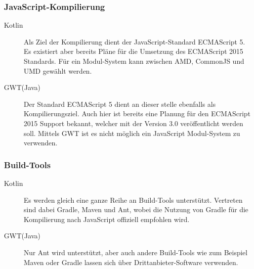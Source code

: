 \subsubsection{JavaScript-Kompilierung}
\begin{description}
	\item[Kotlin] Als Ziel der Kompilierung dient der JavaScript-Standard ECMAScript 5. Es existiert aber bereits Pläne für die Umsetzung des ECMAScript 2015 Standards. Für ein Modul-System kann zwischen \gls{AMD}, CommonJS und \gls{UMD} gewählt werden. \cite{kotlinJavaScript, kotlinJsModules} 
	\item[GWT(Java)] Der Standard ECMAScript 5 dient an dieser stelle ebenfalls als Kompilierungsziel. Auch hier ist bereits eine Planung für den ECMAScript 2015 Support bekannt, welcher mit der Version 3.0 veröffentlicht werden soll. Mittels \gls{GWT} ist es nicht möglich ein JavaScript Modul-System zu verwenden. \cite{gwtRoadmap}
\end{description}

\subsubsection{Build-Tools}
\begin{description}
	\item[Kotlin] Es werden gleich eine ganze Reihe an Build-Tools unterstützt. Vertreten sind dabei Gradle, Maven und Ant, wobei die Nutzung von Gradle für die Kompilierung nach JavaScript offiziell empfohlen wird. \cite{kotlinBuildTools, kotlinToJavaScript}
	\item[GWT(Java)] Nur Ant wird unterstützt, aber auch andere Build-Tools wie zum Beispiel Maven oder Gradle lassen sich über Drittanbieter-Software verwenden. \cite{gwtGettingStarted}
\end{description}

